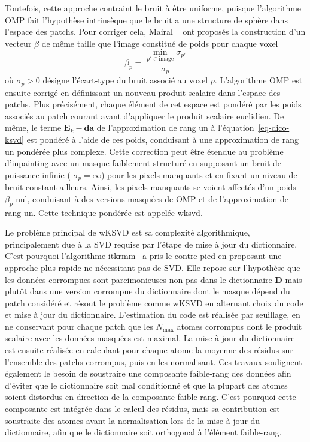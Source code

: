 Toutefois, cette approche contraint le bruit à être uniforme, puisque l'algorithme OMP fait l'hypothèse intrinsèque que le bruit a une structure de sphère dans l'espace des patchs. Pour corriger cela, Mairal \etal{}~\cite{mairal2008tip} ont proposés la construction d'un vecteur $\beta$ de même taille que l'image constitué de poids pour chaque voxel
\begin{equation}
    \beta_p = \frac{\min_{p'\in\text{image}}\sigma_{p'}}{\sigma_p}
\end{equation}
où $\sigma_p>0$ désigne l'écart-type du bruit associé au voxel $p$. L'algorithme OMP est ensuite corrigé en définissant un nouveau produit scalaire dans l'espace des patchs. Plus précisément, chaque élément de cet espace est pondéré par les poids associés au patch courant avant d'appliquer le produit scalaire euclidien. De même, le terme $\mathbf{E}_k-\mathbf{da}$ de l'approximation de rang un à l'équation~\eqref{eq-dico-ksvd} est pondéré à l'aide de ces poids, conduisant à une approximation de rang un pondérée plus complexe. 
%
Cette correction peut être étendue au problème d'inpainting avec un masque faiblement structuré en supposant un bruit de puissance infinie (\ie{} $\sigma_p=\infty$) pour les pixels manquants et en fixant un niveau de bruit constant ailleurs. Ainsi, les pixels manquants se voient affectés d'un poids $\beta_p$ nul, conduisant à des versions masquées de OMP et de l'approximation de rang un. Cette technique pondérée est appelée \gls{wksvd}.

Le problème principal de wKSVD est sa complexité algorithmique, principalement due à la SVD requise par l'étape de mise à jour du dictionnaire. C'est pourquoi l'algorithme \gls{itkrmm}~\cite{naumova2018fast, naumova2017dictionary} a pris le contre-pied en proposant une approche plus rapide ne nécessitant pas de SVD. Elle repose sur l'hypothèse que les données corrompues sont parcimonieuses non pas dans le dictionnaire $\mathbf{D}$ mais plutôt dans une version corrompue du dictionnaire dont le masque dépend du patch considéré et résout le problème comme wKSVD en alternant choix du code et mise à jour du dictionnaire.
%
L'estimation du code est réalisée par seuillage, en ne conservant pour chaque patch que les $N_\mathrm{max}$ atomes corrompus dont le produit scalaire avec les données masquées est maximal. 
La mise à jour du dictionnaire est ensuite réalisée en calculant pour chaque atome la moyenne des résidus sur l'ensemble des patchs corrompus, puis en les normalisant. 
%
Ces travaux soulignent également le besoin de soustraire une composante faible-rang des données afin d'éviter que le dictionnaire soit mal conditionné et que la plupart des atomes soient distordus en direction de la composante faible-rang. C'est pourquoi cette composante est intégrée dans le calcul des résidus, mais sa contribution est soustraite des atomes avant la normalisation lors de la mise à jour du dictionnaire, afin que le dictionnaire soit orthogonal à l'élément faible-rang.

